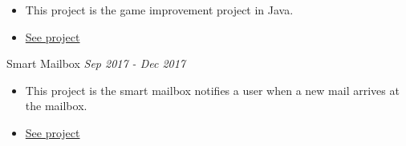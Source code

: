 \documentclass[10pt]{article}
\newenvironment{changemargin}[2]{
  \begin{list}{}{
    \setlength{\topsep}{0pt}
    \setlength{\leftmargin}{#1}
    \setlength{\rightmargin}{#2}
    \setlength{\listparindent}{\parindent}
    \setlength{\itemindent}{\parindent}
    \setlength{\parsep}{\parskip}
  }
  \item[]}{\end{list}
}
\newcommand{\project}[2]{
	{#1} \hfill \emph{#2}\\ \medskip
}
\newenvironment{body} {
	\vspace*{-16pt}
	\begin{changemargin}{-0.25in}{-0.5in}
  }
	{\end{changemargin}
}
\begin{document}
\begin{body}
\begin{itemize} \itemsep -0pt  %
      \item  This project is the game improvement project in Java.
      \item \href{https://github.com/jeongwhanchoi/helicopter_battle}{See project}
  	\end{itemize}
\project{Smart Mailbox}{Sep 2017 - Dec 2017}
\begin{itemize} \itemsep -0pt  %
      \item  This project is the smart mailbox notifies a user when a new mail arrives at the mailbox.
      \item \href{https://github.com/jeongwhanchoi/Smart-Mailbox}{See project}
  	\end{itemize}	
\end{body}


\medskip
\end{document}
